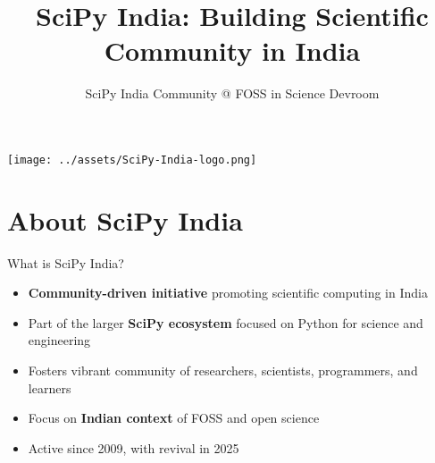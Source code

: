 \documentclass[16pt,t]{beamer}
\title[]{
\textbf{SciPy India: Building Scientific Community in India}}
\author{SciPy India Community @ FOSS in Science Devroom}
\date{}
\begin{document}
\begin{frame}[Title]
\begin{center}
\texttt{[image: ../assets/SciPy-India-logo.png]}
\end{center}
\maketitle
\end{frame}


\section{About SciPy India}

\begin{frame}{What is SciPy India?}
\begin{itemize}
    \item \textbf{Community-driven initiative} promoting scientific computing in India
    \item Part of the larger \textbf{SciPy ecosystem} focused on Python for science and engineering
    \item Fosters vibrant community of researchers, scientists, programmers, and learners
    \item Focus on \textbf{Indian context} of FOSS and open science
    \item Active since 2009, with revival in 2025
\end{itemize}
\end{frame}

\end{document}
